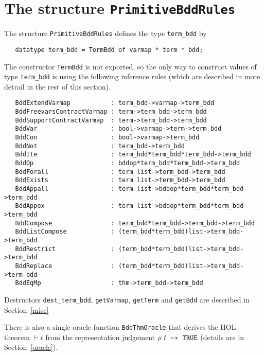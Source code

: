 \documentclass[12pt]{article}
\renewcommand{\t}[1]{\mbox{\tt #1}}
\newcommand{\ml}[1]{{\tt #1}}
\newcommand{\termbdd}[3]{\mbox{$#1~#2~\mapsto~#3$}}
\newcommand\termbddty{\texttt{term\_bdd}\xspace}
\begin{document}
\section{The structure \t{PrimitiveBddRules}}\label{PrimitiveBddRules}


The structure \ml{PrimitiveBddRules} defines the type \termbddty{} by

\vspace*{-2mm}

\begin{verbatim}
   datatype term_bdd = TermBdd of varmap * term * bdd;
\end{verbatim}

\vspace*{-2mm}

The constructor \t{TermBdd} is not exported, so the only way to construct
values of type \termbddty is using the following inference rules
(which are described in more detrail in the rest of this section).

{\footnotesize\begin{verbatim}
   BddExtendVarmap           : term_bdd->varmap->term_bdd
   BddFreevarsContractVarmap : term->term_bdd->term_bdd
   BddSupportContractVarmap  : term->term_bdd->term_bdd
   BddVar                    : bool->varmap->term->term_bdd
   BddCon                    : bool->varmap->term_bdd
   BddNot                    : term_bdd->term_bdd
   BddIte                    : term_bdd*term_bdd*term_bdd->term_bdd
   BddOp                     : bddop*term_bdd*term_bdd->term_bdd
   BddForall                 : term list->term_bdd->term_bdd
   BddExists                 : term list->term_bdd->term_bdd
   BddAppall                 : term list->bddop*term_bdd*term_bdd->term_bdd
   BddAppex                  : term list->bddop*term_bdd*term_bdd->term_bdd
   BddCompose                : term_bdd*term_bdd->term_bdd->term_bdd
   BddListCompose            : (term_bdd*term_bdd)list->term_bdd->term_bdd
   BddRestrict               : (term_bdd*term_bdd)list->term_bdd->term_bdd
   BddReplace                : (term_bdd*term_bdd)list->term_bdd->term_bdd
   BddEqMp                   : thm->term_bdd->term_bdd
\end{verbatim}}

Destructors \t{dest\_term\_bdd}, \t{getVarmap}, \t{getTerm}
and \t{getBdd} are described in Section~\ref{misc}

There is also a single oracle function
\t{BddThmOracle} that derives the HOL theorem $\vdash t$
from the representation judgement \termbdd{\rho}{t}{\ml{TRUE}}
(details are in Section~\ref{oracle}).
\end{document}
